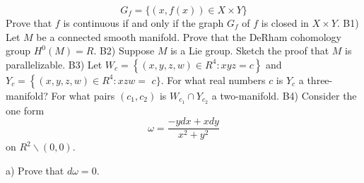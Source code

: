 \documentclass[14pt]{extarticle}
\begin{document}
$$
G_{f}=\{(x, f(x)) \in X \times Y\}
$$
Prove that $f$ is continuous if and only if the graph $G_{f}$ of $f$ is closed in $X \times Y$.
\newpage
B1) Let $M$ be a connected smooth manifold. Prove that the DeRham cohomology group $H^{0}(M)=R$.
\newpage
B2) Suppose $M$ is a Lie group. Sketch the proof that $M$ is parallelizable.
\newpage
B3) Let $W_{c}=\left\{(x, y, z, w) \in R^{4}: x y z=c\right\}$ and $Y_{c}=\left\{(x, y, z, w) \in R^{4}: x z w=\right.$ $c\}$. For what real numbers $c$ is $Y_{c}$ a three-manifold? For what pairs $\left(c_{1}, c_{2}\right)$ is $W_{c_{1}} \cap Y_{c_{2}}$ a two-manifold.
\newpage
B4) Consider the one form
$$
\omega=\frac{-y d x+x d y}{x^{2}+y^{2}}
$$
on $R^{2} \backslash(0,0)$.

a) Prove that $d \omega=0$.
\end{document}
